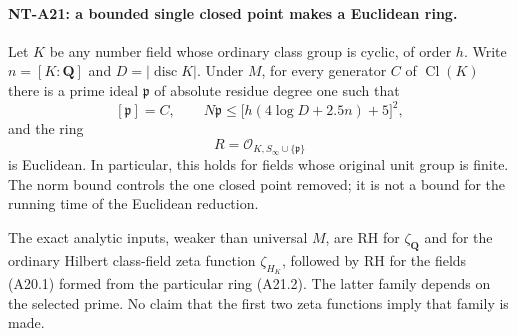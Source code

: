 \paragraph{NT-A21: a bounded single closed point makes a Euclidean ring.}
Let $K$ be any number field whose ordinary class group
is cyclic, of order $h$. Write $n=[K:\mathbf Q]$ and
$D=|\operatorname{disc}K|$. Under $M$, for every
generator $C$ of $\operatorname{Cl}(K)$ there is a
prime ideal $\mathfrak p$ of absolute residue degree
one such that
\[
 [\mathfrak p]=C,\qquad
 N\mathfrak p\le
                \bigl[h(4\log D+2.5n)+5\bigr]^2,
 \tag{A21.1}
\]
and the ring
\[
             R=\mathcal O_{K,S_\infty\cup\{\mathfrak p\}}
 \tag{A21.2}
\]
is Euclidean. In particular, this holds for fields
whose original unit group is finite. The norm bound
controls the one closed point removed; it is not a
bound for the running time of the Euclidean reduction.

The exact analytic inputs, weaker than universal $M$,
are RH for $\zeta_{\mathbf Q}$ and for the ordinary
Hilbert class-field zeta function $\zeta_{H_K}$,
followed by RH for the fields (A20.1) formed from
the particular ring (A21.2). The latter family
depends on the selected prime. No claim that the
first two zeta functions imply that family is made.

